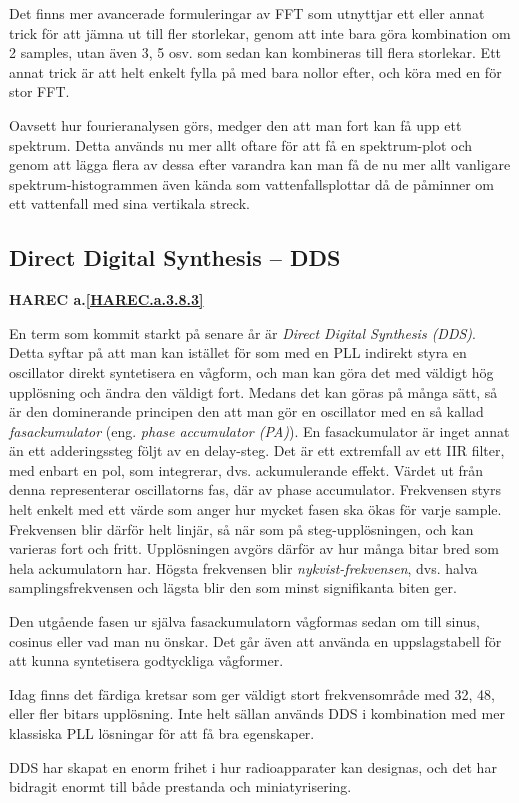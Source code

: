 Det finns mer avancerade formuleringar av FFT som utnyttjar ett eller annat
trick för att jämna ut till fler storlekar, genom att inte bara göra
kombination om 2 samples, utan även 3, 5 osv. som sedan kan kombineras till
flera storlekar.
Ett annat trick är att helt enkelt fylla på med bara nollor efter, och köra
med en för stor FFT.

Oavsett hur fourieranalysen görs, medger den att man fort kan få upp ett
spektrum.
Detta används nu mer allt oftare för att få en spektrum-plot och genom att
lägga flera av dessa efter varandra kan man få de nu mer allt vanligare
spektrum-histogrammen även kända som vattenfallsplottar då de påminner om ett
vattenfall med sina vertikala streck.

\subsection{Direct Digital Synthesis -- DDS}
\textbf{HAREC a.\ref{HAREC.a.3.8.3}\label{myHAREC.a.3.8.3}}

En term som kommit starkt på senare år är \emph{Direct Digital Synthesis (DDS)}.
Detta syftar på att man kan istället för som med en PLL indirekt styra en
oscillator direkt syntetisera en vågform, och man kan göra det med väldigt
hög upplösning och ändra den väldigt fort.
Medans det kan göras på många sätt, så är den dominerande principen den att
man gör en oscillator med en så kallad \emph{fasackumulator} (eng. \emph{phase
 accumulator (PA)}).
En fasackumulator är inget annat än ett adderingssteg följt av en delay-steg.
Det är ett extremfall av ett IIR filter, med enbart en pol, som integrerar,
dvs. ackumulerande effekt.
Värdet ut från denna representerar oscillatorns fas, där av phase accumulator.
Frekvensen styrs helt enkelt med ett värde som anger hur mycket fasen ska
ökas för varje sample.
Frekvensen blir därför helt linjär, så när som på steg-upplösningen, och kan
varieras fort och fritt.
Upplösningen avgörs därför av hur många bitar bred som hela ackumulatorn har.
Högsta frekvensen blir \emph{nykvist-frekvensen}, dvs. halva
samplingsfrekvensen och lägsta blir den som minst signifikanta biten ger.

Den utgående fasen ur själva fasackumulatorn vågformas sedan om till sinus,
cosinus eller vad man nu önskar. Det går även att använda en uppslagstabell
för att kunna syntetisera godtyckliga vågformer.

Idag finns det färdiga kretsar som ger väldigt stort frekvensområde med 32, 48,
eller fler bitars upplösning.
Inte helt sällan används DDS i kombination med mer klassiska PLL lösningar
för att få bra egenskaper.

DDS har skapat en enorm frihet i hur radioapparater kan designas, och det har
bidragit enormt till både prestanda och miniatyrisering.
